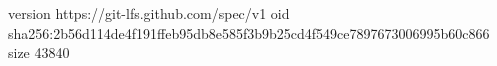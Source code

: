 version https://git-lfs.github.com/spec/v1
oid sha256:2b56d114de4f191ffeb95db8e585f3b9b25cd4f549ce7897673006995b60c866
size 43840
